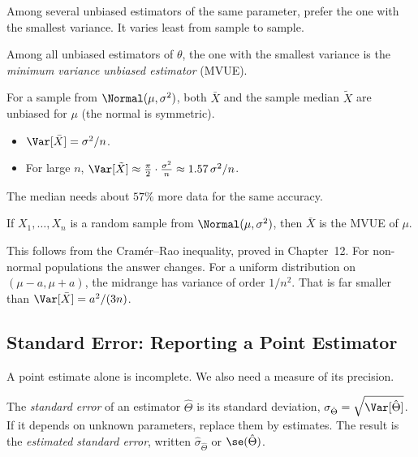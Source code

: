 Among several unbiased estimators of the same parameter, prefer the one with the smallest variance. It varies least from sample to sample.

\begin{definition}[MVUE]
Among all unbiased estimators of $\theta$, the one with the smallest variance is the \emph{minimum variance unbiased estimator} (MVUE).
\end{definition}

\begin{example}
For a sample from $\Normal(\mu,\sigma^2)$, both $\bar{X}$ and the sample median $\tilde{X}$ are unbiased for $\mu$ (the normal is symmetric).
\begin{itemize}
  \item $\Var[\bar{X}]=\sigma^2/n$.
  \item For large $n$, $\Var[\tilde{X}]\approx\frac\pi2\cdot\frac{\sigma^2}n\approx1.57\,\sigma^2/n$.
\end{itemize}
The median needs about $57\%$ more data for the same accuracy.
\end{example}

\begin{theorem}\label{thm:mvue}
If $X_1,\dots,X_n$ is a random sample from $\Normal(\mu,\sigma^2)$, then $\bar{X}$ is the MVUE of $\mu$.
\end{theorem}

This follows from the Cram\'er--Rao inequality, proved in Chapter~12. For non-normal populations the answer changes. For a uniform distribution on $(\mu-a,\mu+a)$, the midrange has variance of order $1/n^2$. That is far smaller than $\Var[\bar{X}]=a^2/(3n)$.

\subsection{Standard Error: Reporting a Point Estimator}

A point estimate alone is incomplete. We also need a measure of its precision.

\begin{definition}
The \emph{standard error} of an estimator $\hat\Theta$ is its standard deviation, $\sigma_{\hat\Theta}=\sqrt{\Var[\hat\Theta]}$. If it depends on unknown parameters, replace them by estimates. The result is the \emph{estimated standard error}, written $\hat\sigma_{\hat\Theta}$ or $\se(\hat\Theta)$.
\end{definition}

